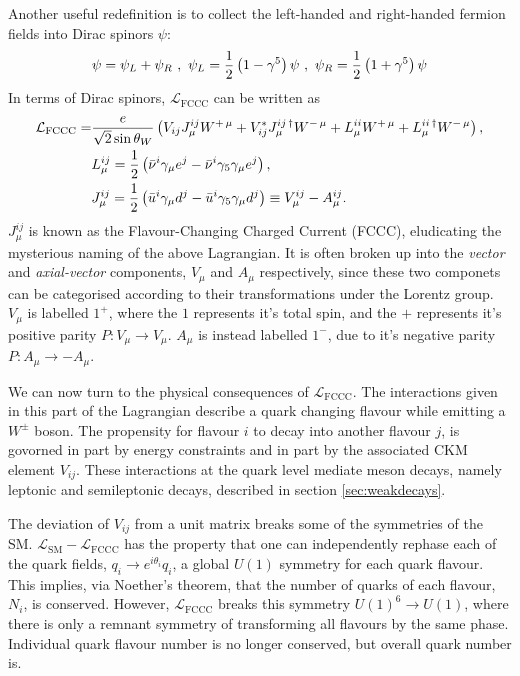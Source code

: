 Another useful redefinition is to collect the left-handed and right-handed fermion fields into Dirac spinors $\psi$:
\begin{align}
  \psi = \psi_L + \psi_R \,\,,\,\, \psi_L = {1\over 2}\left(1-\gamma^5 \right) \psi \,\,,\,\, \psi_R = {1\over 2}\left(1+\gamma^5\right) \psi
\end{align}
In terms of Dirac spinors, $\mathcal{L}_{\text{FCCC}}$ can be written as
\begin{align}
  \mathcal{L}_{\text{FCCC}} =& {e \over \sqrt{2} \sin \theta_W} \left( V_{ij} J^{ij}_{\mu} W^{+\,\mu} + V^*_{ij} J^{ij\,\dagger}_{\mu} W^{-\,\mu} +
L^{ii}_{\mu} W^{+\,\mu} + L^{ii\,\dagger}_{\mu} W^{-\,\mu}
\right), \\
  &L^{ij}_{\mu} = {1\over2}\left(\bar{\nu}^i \gamma_{\mu} e^j - \bar{\nu}^i \gamma_5 \gamma_{\mu} e^j\right), \\
  &J^{ij}_{\mu} = {1\over2}\left(\bar{u}^i \gamma_{\mu} d^j - \bar{u}^i \gamma_5 \gamma_{\mu} d^j\right) \equiv V^{ij}_{\mu} - A^{ij}_{\mu}.
\end{align}
$J^{ij}_{\mu}$ is known as the Flavour-Changing Charged Current (FCCC), eludicating the mysterious naming of the above Lagrangian. It is often broken up into the {\it{vector}} and {\it{axial-vector}} components, $V_{\mu}$ and $A_{\mu}$ respectively, since these two componets can be categorised according to their transformations under the Lorentz group. $V_{\mu}$ is labelled $1^+$, where the $1$ represents it's total spin, and the $+$ represents it's positive parity $P: V_{\mu} \to V_{\mu}$. $A_{\mu}$ is instead labelled $1^-$, due to it's negative parity $P: A_{\mu} \to - A_{\mu}$.

We can now turn to the physical consequences of $\mathcal{L}_{\text{FCCC}}$. The interactions given in this part of the Lagrangian describe a quark changing flavour while emitting a $W^{\pm}$ boson. The propensity for flavour $i$ to decay into another flavour $j$, is govorned in part by energy constraints and in part by the associated CKM element $V_{ij}$. These
interactions at the quark level mediate meson decays, namely leptonic and semileptonic decays, described in section \ref{sec:weakdecays}.

The deviation of $V_{ij}$ from a unit matrix breaks some of the symmetries of the SM. $\mathcal{L}_{\text{SM}}-\mathcal{L}_{\text{FCCC}}$ has the property that one can independently rephase each of the quark fields, $q_i\to e^{i\theta_i}q_i$, a global $U(1)$ symmetry for each quark flavour. This implies, via Noether's theorem, that the number of quarks of each flavour, $N_i$, is conserved. However, $\mathcal{L}_{\text{FCCC}}$ breaks this symmetry $U(1)^6\to U(1)$, where there is only a remnant symmetry of transforming all flavours by the same phase. Individual quark flavour number is no longer conserved, but overall quark number is.

